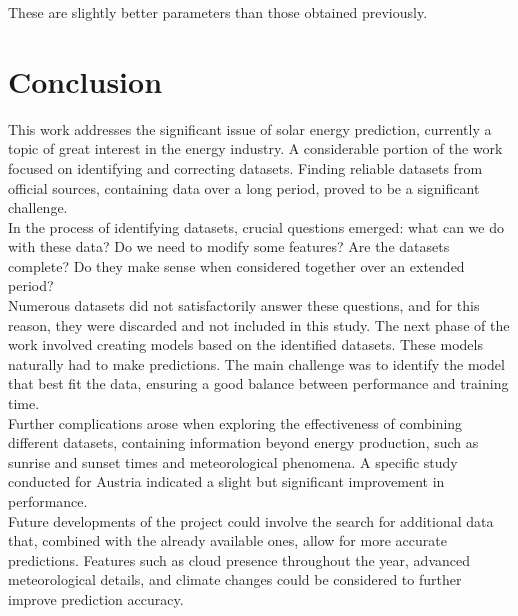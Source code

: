 \documentclass[12pt]{article}
\begin{document}
These are slightly better parameters than those obtained previously.


\newpage
\section{Conclusion}
This work addresses the significant issue of solar energy prediction, currently a topic of great interest in the energy industry. A considerable portion of the work focused on identifying and correcting datasets. Finding reliable datasets from official sources, containing data over a long period, proved to be a significant challenge.
\\
In the process of identifying datasets, crucial questions emerged: what can we do with these data? Do we need to modify some features? Are the datasets complete? Do they make sense when considered together over an extended period?
\\
Numerous datasets did not satisfactorily answer these questions, and for this reason, they were discarded and not included in this study. The next phase of the work involved creating models based on the identified datasets. These models naturally had to make predictions. The main challenge was to identify the model that best fit the data, ensuring a good balance between performance and training time.
\\
Further complications arose when exploring the effectiveness of combining different datasets, containing information beyond energy production, such as sunrise and sunset times and meteorological phenomena. A specific study conducted for Austria indicated a slight but significant improvement in performance.
\\
Future developments of the project could involve the search for additional data that, combined with the already available ones, allow for more accurate predictions. Features such as cloud presence throughout the year, advanced meteorological details, and climate changes could be considered to further improve prediction accuracy.

\clearpage
\printbibliography
\end{document}
